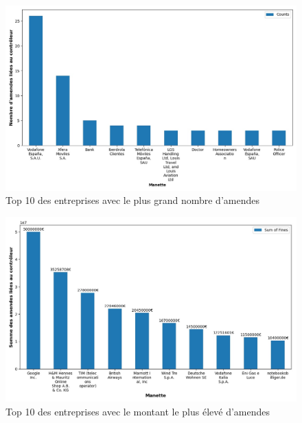 \documentclass[french]{article}
\begin{document}
	\begin{figure}
		[H]\centering\includegraphics[width=0.6\linewidth]{graphs/top10_controller}
		\caption{Top 10 des entreprises avec le plus grand nombre d'amendes}
	\end{figure}
	
	\begin{figure}
		[H]\centering\includegraphics[width=0.6\linewidth]{graphs/top10_controller_fines}
		\caption{Top 10 des entreprises avec le montant le plus élevé d'amendes}
	 \end{figure}



\newpage
\end{document}
